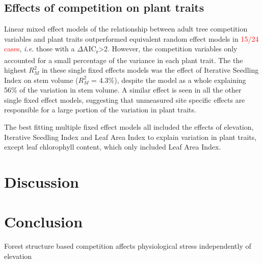 \documentclass[a4paper,11pt]{article}
\newcommand{\todo}[1]{\textcolor{red}{#1}}   %
\begin{document}
\subsection{Effects of competition on plant traits}

Linear mixed effect models of the relationship between adult tree competition variables and plant traits outperformed equivalent random effect models in \todo{15/24 cases}, \textit{i.e.} those with a $\Delta$AIC\textsubscript{r}>2. However, the competition variables only accounted for a small percentage of the variance in each plant trait. The the highest $R_M^2$ in these single fixed effects models was the effect of Iterative Seedling Index on stem volume ($R_M^2$ = 4.3\%), despite the model as a whole explaining 56\% of the variation in stem volume. A similar effect is seen in all the other single fixed effect models, suggesting that unmeasured site specific effects are responsible for a large portion of the variation in plant traits.

The best fitting multiple fixed effect models all included the effects of elevation, Iterative Seedling Index and Leaf Area Index to explain variation in plant traits, except leaf chlorophyll content, which only included Leaf Area Index. 


\section*{Discussion}

\section*{Conclusion}


Forest structure based competition affects physiological stress independently of elevation

\end{document}
